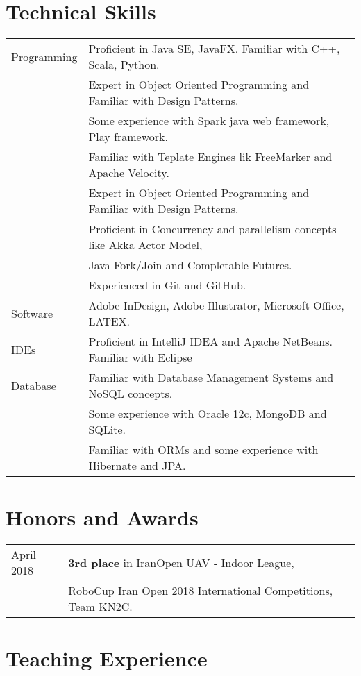 \documentclass[letterpaper]{article}
\begin{document}
\section*{Technical Skills}

{\renewcommand{\arraystretch}{1.2}
\begin{tabular}{l l}
Programming & Proficient in Java SE, JavaFX. Familiar with C++, Scala, Python.
	\\& Expert in Object Oriented Programming and Familiar with Design Patterns.
	\\& Some experience with Spark java web framework, Play framework.
	\\& Familiar with Teplate Engines lik FreeMarker and Apache Velocity.
	\\& Expert in Object Oriented Programming and Familiar with Design Patterns.
	\\& Proficient in Concurrency and parallelism concepts like Akka Actor Model,\\& Java Fork/Join and Completable Futures.
	\\& Experienced in Git and GitHub.
\\
Software & Adobe InDesign, Adobe Illustrator, Microsoft Office, LATEX.
\\
IDEs & Proficient in IntelliJ IDEA and Apache NetBeans. Familiar with Eclipse
\\
Database & Familiar with Database Management Systems and NoSQL concepts.
	\\& Some experience with Oracle 12c, MongoDB and SQLite.
	\\& Familiar with ORMs and some experience with Hibernate and JPA.
\end{tabular}

\section*{Honors and Awards}

{\renewcommand{\arraystretch}{1.2}
\begin{tabular}{l l}
April 2018 & \textbf{3rd place} in IranOpen UAV - Indoor League, \\&RoboCup Iran Open 2018 International Competitions, Team KN2C.
\end{tabular}

\section*{Teaching Experience}

}}
\end{document}
